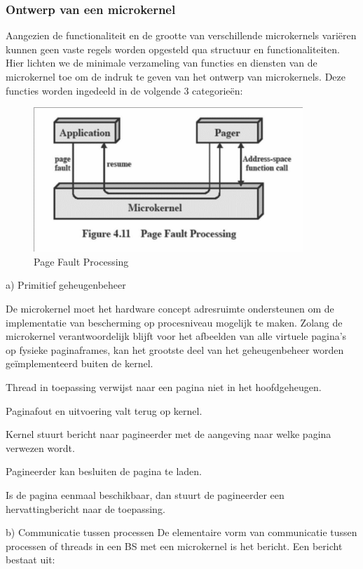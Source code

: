 \subsubsection{Ontwerp van een microkernel}

Aangezien de functionaliteit en de grootte van verschillende microkernels variëren kunnen geen vaste regels worden opgesteld qua structuur en functionaliteiten. Hier lichten we de minimale verzameling van functies en diensten van de microkernel toe om de indruk te geven van het ontwerp van microkernels. Deze functies worden ingedeeld in de volgende 3 categorieën:

\begin{figure}[htp]
    \centering
            \includegraphics[width=4in]{img/pagefaultprocessing.png}
        \caption{Page Fault Processing}
    \label{fig:Page Fault Processing}
\end{figure}

a)	Primitief geheugenbeheer

De microkernel moet het hardware concept adresruimte ondersteunen om de implementatie van bescherming op procesniveau mogelijk te maken. Zolang de microkernel verantwoordelijk blijft voor het afbeelden van alle virtuele pagina’s op fysieke paginaframes, kan het grootste deel van het geheugenbeheer worden geïmplementeerd buiten de kernel.

Thread in toepassing verwijst naar een pagina niet in het hoofdgeheugen.

Paginafout en uitvoering valt terug op kernel.

Kernel stuurt bericht naar pagineerder met de aangeving naar welke pagina verwezen wordt.

Pagineerder kan besluiten de pagina te laden.

Is de pagina eenmaal beschikbaar, dan stuurt de pagineerder een hervattingbericht naar de toepassing.

b)	Communicatie tussen processen
De elementaire vorm van communicatie tussen processen of threads in een BS met een microkernel is het bericht. Een bericht bestaat uit:

